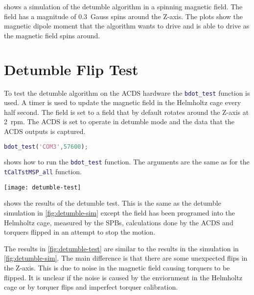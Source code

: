  shows a simulation of the detumble algorithm in a spinning magnetic field. The field has a magnitude of 0.3~Gauss spins around the Z-axis. The plots show the magnetic dipole moment that the algorithm wants to drive and is able to drive as the magnetic field spins around.


\section{Detumble Flip Test}

To test the detumble algorithm on the \ac{ACDS} hardware the \lstinline[style=code,language=Matlab]$bdot_test$ function is used. A timer is used to update the magnetic field in the Helmholtz cage every half second. The field is set to a field that by default rotates around the Z-axis at 2~rpm. The \ac{ACDS} is set to operate in detumble mode and the data that the \ac{ACDS} outputs is captured.

\begin{lstlisting}[style=code,caption={Testing B-dot},label={lst:MSP-bdot},language=Matlab]
bdot_test('COM3',57600);
\end{lstlisting}

 shows how to run the \lstinline[style=code,language=Matlab]$bdot_test$ function. The arguments are the same as for the \lstinline[style=code,language=Matlab]$tCalTstMSP_all$ function.

\begin{sidewaysfigure}
    \centering
    \texttt{[image: detumble-test]}
  \caption{Test of the B-dot controller}
    \label{fig:detumble-test}
\end{sidewaysfigure}

 shows the results of the detumble test. This is the same as the detumble simulation in \cref{fig:detumble-sim} except the field has been programed into the Helmholtz cage, measured by the \acp{SPB}, calculations done by the \ac{ACDS} and torquers flipped in an attempt to stop the motion.

The results in \cref{fig:detumble-test} are similar to the results in the simulation in \cref{fig:detumble-sim}. The main difference is that there are some unexpected flips in the Z-axis. This is due to noise in the magnetic field causing torquers to be flipped. It is unclear if the noise is caused by the enviornment in the Helmholtz cage or by torquer flips and imperfect torquer calibration.


